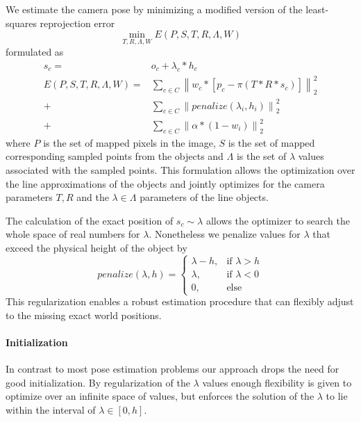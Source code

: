 We estimate the camera pose by minimizing a modified version of the least-squares reprojection error 
\begin{equation}
  \label{eq:static_calibration_error}
  \min_{T, R, \Lambda, W} E(P, S, T, R, \Lambda, W) 
\end{equation}
formulated as
\begin{equation}
  \begin{split}
    s_c =& o_c + \lambda_c * h_c \\
  E(P, S, T, R, \Lambda, W ) =& 
  \sum_{c \in C} 
  \left\lVert 
    w_c * [ p_c - \pi(T * R * s_c) ]
  \right\rVert_2^2 \\ 
  +& 
  \sum_{c \in C} 
  \left\lVert 
  penalize(\lambda_i, h_i)
  \right\rVert_2^2 \\ 
  +& 
  \sum_{c \in C} 
  \left\lVert 
  \alpha * (1 - w_i)
  \right\rVert_2^2 
\end{split}
\label{eq:reprojection_error}
\end{equation}
where $P$ is the set of mapped pixels in the image, $S$ is the set of mapped corresponding sampled points from the objects and $\Lambda$ is the set of $\lambda$ values associated with the sampled points.
This formulation allows the optimization over the line approximations of the objects and jointly optimizes for the camera parameters $T, R$ and the $\lambda \in \Lambda$ parameters of the line objects.

The calculation of the exact position of $s_c \sim \lambda$ allows the optimizer to search the whole space of real numbers for $\lambda$.
Nonetheless we penalize values for $\lambda$ that exceed the physical height of the object by 
\begin{equation}
    penalize(\lambda, h) =
    \begin{cases}
      \lambda - h,& \text{if } \lambda > h\\
      \lambda,    & \text{if } \lambda < 0\\
      0,    & \text{else}
    \end{cases} 
\end{equation}
This regularization enables a robust estimation procedure that can flexibly adjust to the missing exact world positions.

\paragraph{Initialization}
In contrast to most pose estimation problems our approach drops the need for good initialization. 
By regularization of the $\lambda$ values enough flexibility is given to optimize over an infinite space of values, 
but enforces the solution of the $\lambda$ to lie within the interval of $\lambda \in [0, h]$.

